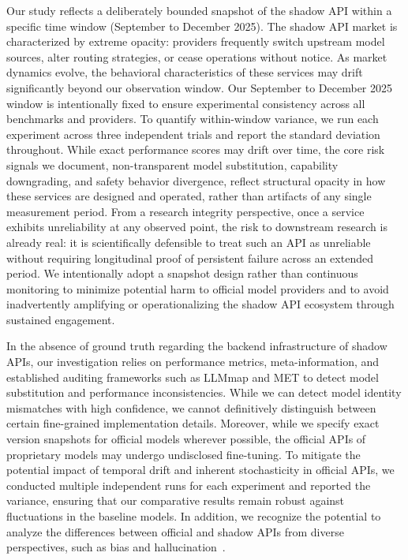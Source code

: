 \documentclass[letterpaper,twocolumn,10pt]{article}
\begin{document}
Our study reflects a deliberately bounded snapshot of the shadow API within a specific time window (September to December 2025).
The shadow API market is characterized by extreme opacity: providers frequently switch upstream model sources, alter routing strategies, or cease operations without notice.
As market dynamics evolve, the behavioral characteristics of these services may drift significantly beyond our observation window.
Our September to December 2025 window is intentionally fixed to ensure experimental consistency across all benchmarks and providers. To quantify within-window variance, we run each experiment across three independent trials and report the standard deviation throughout.
While exact performance scores may drift over time, the core risk signals we document, non-transparent model substitution, capability downgrading, and safety behavior divergence, reflect structural opacity in how these services are designed and operated, rather than artifacts of any single measurement period.
From a research integrity perspective, once a service exhibits unreliability at any observed point, the risk to downstream research is already real: it is scientifically defensible to treat such an API as unreliable without requiring longitudinal proof of persistent failure across an extended period.
We intentionally adopt a snapshot design rather than continuous monitoring to minimize potential harm to official model providers and to avoid inadvertently amplifying or operationalizing the shadow API ecosystem through sustained engagement.

In the absence of ground truth regarding the backend infrastructure of shadow APIs, our investigation relies on performance metrics, meta-information, and established auditing frameworks such as LLMmap and MET to detect model substitution and performance inconsistencies.
While we can detect model identity mismatches with high confidence, we cannot definitively distinguish between certain fine-grained implementation details.
Moreover, while we specify exact version snapshots for official models wherever possible, the official APIs of proprietary models may undergo undisclosed fine-tuning.
To mitigate the potential impact of temporal drift and inherent stochasticity in official APIs, we conducted multiple independent runs for each experiment and reported the variance, ensuring that our comparative results remain robust against fluctuations in the baseline models.
In addition, we recognize the potential to analyze the differences between official and shadow APIs from diverse perspectives, such as bias and hallucination~\cite{JLSLBZ24, Z251}.
\end{document}
